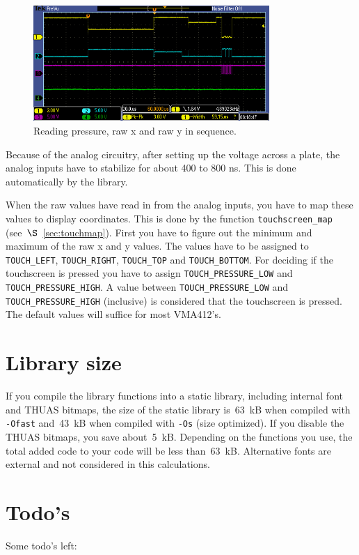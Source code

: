 \documentclass[12pt]{article}
\begin{document}
\begin{figure}[!ht]
\centering
\includegraphics[width=0.8\textwidth]{sample_pressure_x_y}
\caption{Reading pressure, raw x and\textbf{} raw y in sequence.}
\label{fig:26}
\end{figure}

Because of the analog circuitry, after setting up the voltage across a plate, the analog inputs have to stabilize for about 400 to 800 ns. This is done automatically by the library.

When the raw values have read in from the analog inputs, you have to map these values to display coordinates. This is done by the function \lstinline|touchscreen_map| (see~$\S$~\ref{sec:touchmap}). First you have to figure out the minimum and maximum of the raw x and y values. The values have to be assigned to \lstinline|TOUCH_LEFT|, \lstinline|TOUCH_RIGHT|, \lstinline|TOUCH_TOP| and \lstinline|TOUCH_BOTTOM|. For deciding if the touchscreen is pressed you have to assign \lstinline|TOUCH_PRESSURE_LOW| and \lstinline|TOUCH_PRESSURE_HIGH|. A value between \lstinline|TOUCH_PRESSURE_LOW| and \lstinline|TOUCH_PRESSURE_HIGH| (inclusive) is considered that the touchscreen is pressed. The default values will suffice for most VMA412's.


\section{Library size}
If you compile the library functions into a static library, including internal font and THUAS bitmaps, the size of the static library is~63~kB when compiled with \lstinline|-Ofast| and~43~kB when compiled with \lstinline|-Os| (size optimized). If you disable the THUAS bitmaps, you save about~5~kB. Depending on the functions you use, the total added code to your code will be less than~63~kB. Alternative fonts are external and not considered in this calculations. 

\section{Todo's}
Some todo's left:
\end{document}
